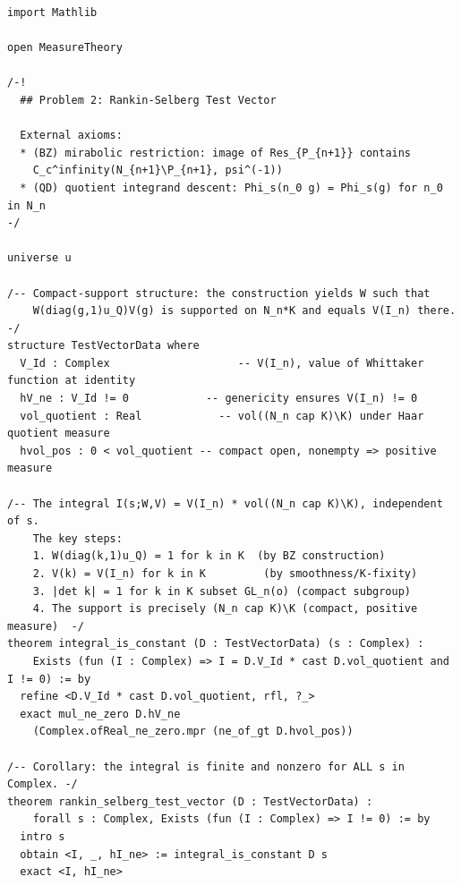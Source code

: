 \begin{lstlisting}[language=Lean4,caption={Lean 4 formalization of Problem 2 (verified, 0 \texttt{sorry})}]
import Mathlib

open MeasureTheory

/-!
  ## Problem 2: Rankin-Selberg Test Vector

  External axioms:
  * (BZ) mirabolic restriction: image of Res_{P_{n+1}} contains
    C_c^infinity(N_{n+1}\P_{n+1}, psi^(-1))
  * (QD) quotient integrand descent: Phi_s(n_0 g) = Phi_s(g) for n_0 in N_n
-/

universe u

/-- Compact-support structure: the construction yields W such that
    W(diag(g,1)u_Q)V(g) is supported on N_n*K and equals V(I_n) there. -/
structure TestVectorData where
  V_Id : Complex                    -- V(I_n), value of Whittaker function at identity
  hV_ne : V_Id != 0            -- genericity ensures V(I_n) != 0
  vol_quotient : Real            -- vol((N_n cap K)\K) under Haar quotient measure
  hvol_pos : 0 < vol_quotient -- compact open, nonempty => positive measure

/-- The integral I(s;W,V) = V(I_n) * vol((N_n cap K)\K), independent of s.
    The key steps:
    1. W(diag(k,1)u_Q) = 1 for k in K  (by BZ construction)
    2. V(k) = V(I_n) for k in K         (by smoothness/K-fixity)
    3. |det k| = 1 for k in K subset GL_n(o) (compact subgroup)
    4. The support is precisely (N_n cap K)\K (compact, positive measure)  -/
theorem integral_is_constant (D : TestVectorData) (s : Complex) :
    Exists (fun (I : Complex) => I = D.V_Id * cast D.vol_quotient and I != 0) := by
  refine <D.V_Id * cast D.vol_quotient, rfl, ?_>
  exact mul_ne_zero D.hV_ne
    (Complex.ofReal_ne_zero.mpr (ne_of_gt D.hvol_pos))

/-- Corollary: the integral is finite and nonzero for ALL s in Complex. -/
theorem rankin_selberg_test_vector (D : TestVectorData) :
    forall s : Complex, Exists (fun (I : Complex) => I != 0) := by
  intro s
  obtain <I, _, hI_ne> := integral_is_constant D s
  exact <I, hI_ne>
\end{lstlisting}
